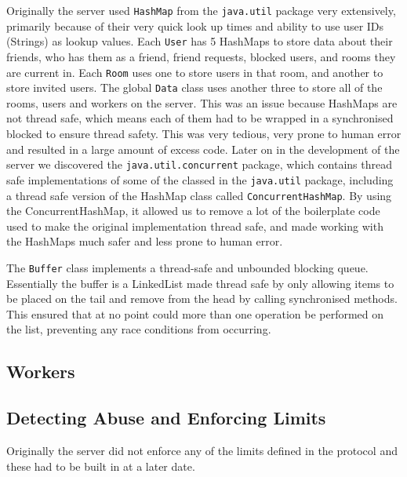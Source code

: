 Originally the server used \texttt{HashMap} from the \texttt{java.util} package very extensively, primarily because of their very quick look up times and ability to use user IDs (Strings) as lookup values. Each \texttt{User} has 5 HashMaps to store data about their friends, who has them as a friend, friend requests, blocked users, and rooms they are current in. Each \texttt{Room} uses one to store users in that room, and another to store invited users. The global \texttt{Data} class uses another three to store all of the rooms, users and workers on the server. This was an issue because HashMaps are not thread safe, which means each of them had to be wrapped in a synchronised blocked to ensure thread safety. This was very tedious, very prone to human error and resulted in a large amount of excess code. Later on in the development of the server we discovered the \texttt{java.util.concurrent} package, which contains thread safe implementations of some of the classed in the \texttt{java.util} package, including a thread safe version of the HashMap class called \texttt{ConcurrentHashMap}. By using the ConcurrentHashMap, it allowed us to remove a lot of the boilerplate code used to make the original implementation thread safe, and made working with the HashMaps much safer and less prone to human error.

The \texttt{Buffer} class implements a thread-safe and unbounded blocking queue. Essentially the buffer is a LinkedList made thread safe by only allowing items to be placed on the tail and remove from the head by calling synchronised methods. This ensured that at no point could more than one operation be performed on the list, preventing any race conditions from occurring.

\subsection{Workers}

\subsection{Detecting Abuse and Enforcing Limits}
Originally the server did not enforce any of the limits defined in the protocol and these had to be built in at a later date.
